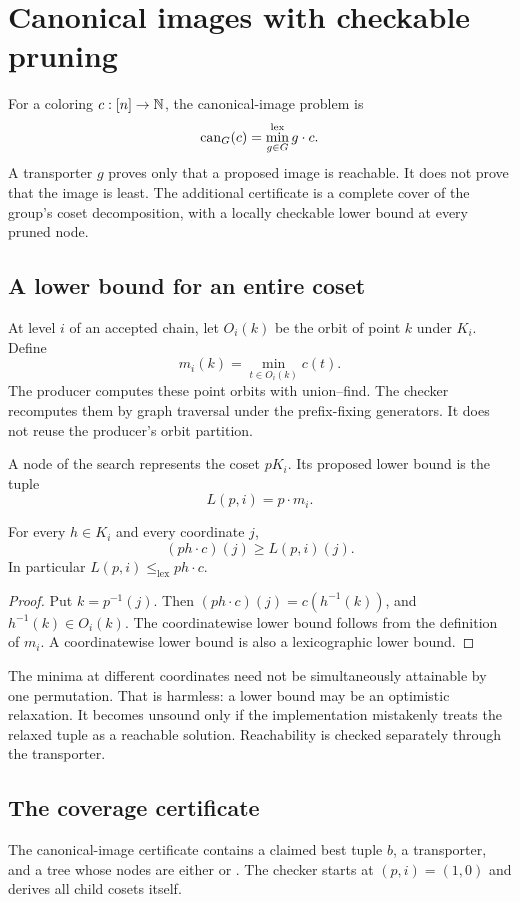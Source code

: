 \section{Canonical images with checkable pruning}
\label{sec:canonical}
For a coloring $c:[n]\to\mathbb N$, the canonical-image problem is
\[
  \operatorname{can}_G(c)=\min_{g\in G}^{\mathrm{lex}} g\cdot c.
\]
A transporter $g$ proves only that a proposed image is reachable. It does not prove that the image is least. The additional certificate is a complete cover of the group's coset decomposition, with a locally checkable lower bound at every pruned node.

\subsection{A lower bound for an entire coset}
At level $i$ of an accepted chain, let $O_i(k)$ be the orbit of point $k$ under $K_i$. Define
\[
  m_i(k)=\min_{t\in O_i(k)}c(t).
\]
The producer computes these point orbits with union--find. The checker recomputes them by graph traversal under the prefix-fixing generators. It does not reuse the producer's orbit partition.

A node of the search represents the coset $pK_i$. Its proposed lower bound is the tuple
\begin{equation}
  L(p,i)=p\cdot m_i.\label{eq:coset-lower}
\end{equation}
\begin{lemma}
For every $h\in K_i$ and every coordinate $j$,
\[
   (ph\cdot c)(j)\geq L(p,i)(j).
\]
In particular $L(p,i)\leq_{\mathrm{lex}}ph\cdot c$.
\end{lemma}
\begin{proof}
Put $k=p^{-1}(j)$. Then
$(ph\cdot c)(j)=c(h^{-1}(k))$, and $h^{-1}(k)\in O_i(k)$.
The coordinatewise lower bound follows from the definition of $m_i$.
A coordinatewise lower bound is also a lexicographic lower bound.
\end{proof}

The minima at different coordinates need not be simultaneously attainable by one permutation. That is harmless: a lower bound may be an optimistic relaxation. It becomes unsound only if the implementation mistakenly treats the relaxed tuple as a reachable solution. Reachability is checked separately through the transporter.

\subsection{The coverage certificate}
The canonical-image certificate contains a claimed best tuple $b$, a transporter, and a tree whose nodes are either \code{["cut"]} or . The checker starts at $(p,i)=(1,0)$ and derives all child cosets itself.

